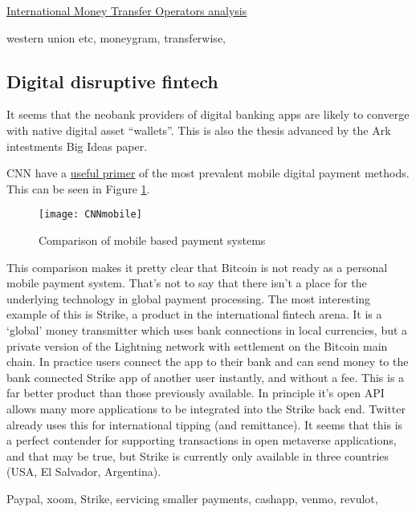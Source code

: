 \href{https://www.toptal.com/finance/market-research-analysts/international-money-transfer}{International Money Transfer Operators analysis}

western union etc, moneygram, transferwise,
\subsection{Digital disruptive fintech}
It seems that the neobank providers of digital banking apps are likely to converge with native digital asset ``wallets''. This is also the thesis advanced by the Ark intestments Big Ideas paper.\par
CNN have a \href{https://money.cnn.com/infographic/technology/mobile-payment-comparison/index.html}{useful primer} of the most prevalent mobile digital payment methods. This can be seen in Figure \ref{fig:CNNmobile}.
\begin{figure}
  \centering
    \texttt{[image: CNNmobile]}
  \caption{Comparison of mobile based payment systems}
  \label{fig:CNNmobile}
\end{figure}
This comparison makes it pretty clear that Bitcoin is not ready as a personal mobile payment system. That's not to say that there isn't a place for the underlying technology in global payment processing. 
The most interesting example of this is Strike, a product in the international fintech arena. It is a `global' money transmitter which uses bank connections in local currencies, but a private version of the Lightning network with settlement on the Bitcoin main chain. In practice users connect the app to their bank and can send money to the bank connected Strike app of another user instantly, and without a fee. This is a far better product than those previously available. In principle it's open API allows many more applications to be integrated into the Strike back end. Twitter already uses this for international tipping (and remittance). It seems that this is a perfect contender for supporting transactions in open metaverse applications, and that may be true, but Strike is currently only available in three countries (USA, El Salvador, Argentina).\par
Paypal, xoom, Strike, servicing smaller payments, cashapp, venmo, revulot, 
